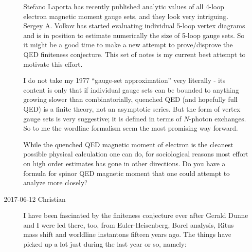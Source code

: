 \begin{description}
Stefano Laporta  has recently published analytic values of all 4-loop
electron magnetic moment gauge sets, and they look very intriguing.
Sergey  A. Volkov has started evaluating individual 5-loop vertex
diagrams and is in position to estimate numerically the size of 5-loop
gauge sets. So it might be a good time to make a new attempt to prove/disprove
the QED finiteness conjecture. This set of notes is my current best attempt
to motivate this effort.

I do not take my 1977 ``gauge-set approximation'' very literally - its
content is only that if individual gauge sets can be bounded to anything
growing slower than combinatorially, quenched QED (and hopefully full
QED) is a finite theory, not an asymptotic series. But the form of vertex
gauge sets is very suggestive; it is defined in terms of $N$-photon
exchanges. So to me the wordline formalism seem the most promising way
forward.

While the quenched QED magnetic moment of electron is the cleanest
possible physical calculation one can do, for sociological reasons most
effort on high order estimates has gone in other directions. Do you have
a formula for spinor QED magnetic moment that one could attempt to
analyze more closely?


\item[2017-06-12 Christian]
I have been
fascinated by the finiteness conjecture ever after Gerald Dunne and I
were led there, too, from Euler-Heisenberg, Borel analysis,
Ritus mass shift and worldline instantons fifteen years ago.
The things have picked up a lot
just during the last year or so, namely:


\end{description}
